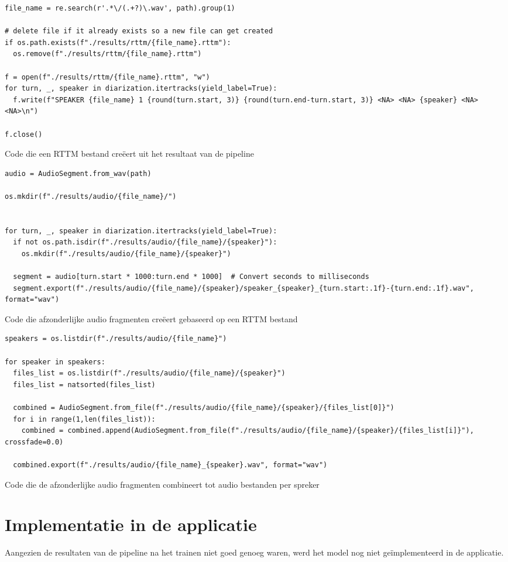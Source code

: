 \begin{listing}
	\begin{verbatim}
file_name = re.search(r'.*\/(.+?)\.wav', path).group(1)

# delete file if it already exists so a new file can get created
if os.path.exists(f"./results/rttm/{file_name}.rttm"):
  os.remove(f"./results/rttm/{file_name}.rttm")

f = open(f"./results/rttm/{file_name}.rttm", "w")
for turn, _, speaker in diarization.itertracks(yield_label=True):
  f.write(f"SPEAKER {file_name} 1 {round(turn.start, 3)} {round(turn.end-turn.start, 3)} <NA> <NA> {speaker} <NA> <NA>\n")

f.close()
	\end{verbatim}
	\caption[Code om RTTM bestand te creëren]{\label{code:maak-rttm}Code die een RTTM bestand creëert uit het resultaat van de pipeline}
\end{listing}

\begin{listing}
	\begin{verbatim}
audio = AudioSegment.from_wav(path)

os.mkdir(f"./results/audio/{file_name}/")


for turn, _, speaker in diarization.itertracks(yield_label=True):
  if not os.path.isdir(f"./results/audio/{file_name}/{speaker}"):
    os.mkdir(f"./results/audio/{file_name}/{speaker}")

  segment = audio[turn.start * 1000:turn.end * 1000]  # Convert seconds to milliseconds
  segment.export(f"./results/audio/{file_name}/{speaker}/speaker_{speaker}_{turn.start:.1f}-{turn.end:.1f}.wav", format="wav")
	\end{verbatim}
	\caption[Code om korte audio bestanden te creëren]{\label{code:korte-bestanden}Code die afzonderlijke audio fragmenten creëert gebaseerd op een RTTM bestand}
\end{listing}

\begin{listing}
	\begin{verbatim}
speakers = os.listdir(f"./results/audio/{file_name}")

for speaker in speakers:
  files_list = os.listdir(f"./results/audio/{file_name}/{speaker}")
  files_list = natsorted(files_list)

  combined = AudioSegment.from_file(f"./results/audio/{file_name}/{speaker}/{files_list[0]}")
  for i in range(1,len(files_list)):
    combined = combined.append(AudioSegment.from_file(f"./results/audio/{file_name}/{speaker}/{files_list[i]}"), crossfade=0.0)

  combined.export(f"./results/audio/{file_name}_{speaker}.wav", format="wav")
	\end{verbatim}
	\caption[Code om audio bestanden per spreker te creëren]{\label{code:audio-per-spreker}Code die de afzonderlijke audio fragmenten combineert tot audio bestanden per spreker}
\end{listing}

\section{Implementatie in de applicatie}
\label{sec:implementatie}
Aangezien de resultaten van de pipeline na het trainen niet goed genoeg waren, werd het model nog niet geïmplementeerd in de applicatie.
